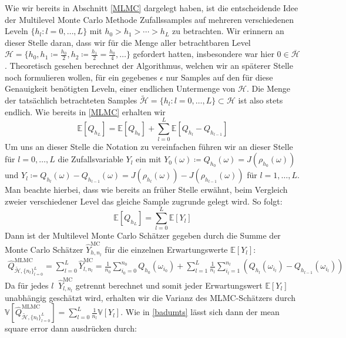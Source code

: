 Wie wir bereits in Abschnitt \ref{MLMC} dargelegt haben, ist die entscheidende Idee der Multilevel Monte Carlo Methode Zufallssamples auf mehreren verschiedenen Leveln $ \{ h_l : l = 0,\dots,L \} $ mit $ h_0 > h_1 > \cdots > h_L $ zu betrachten. Wir erinnern an dieser Stelle daran, dass wir für die Menge aller betrachtbaren Level $ \mathcal{H} = \{ h_0 , h_1 \coloneqq \frac{h_0}{2},h_2 \coloneqq \frac{h_1}{2} = \frac{h_0}{4}, \dots \} $ gefordert hatten, insbesondere war hier $0 \in \overline{\mathcal{H}}$. Theoretisch gesehen berechnet der Algorithmus, welchen wir an späterer Stelle noch formulieren wollen, für ein gegebenes $ \epsilon $ nur Samples auf den für diese Genauigkeit benötigten Leveln, einer endlichen Untermenge von $ \mathcal{H} $. Die Menge der tatsächlich betrachteten Samples $ \tilde{\mathcal{H}} = \{ h_l : l = 0,\dots,L \} \subset \mathcal{H} $ ist also stets endlich.
Wie bereits in \ref{MLMC} erhalten wir 
\[
\mathbb{E}[Q_{h_L}] = \mathbb{E}[Q_{h_0}] + \sum_ {l=0}^L \mathbb{E}[Q_{h_l}-Q_{h_{l-1}}]  
\]
Um uns an dieser Stelle die Notation zu vereinfachen führen wir an dieser Stelle für $ l=0,\dots,L $ die Zufallsvariable $ Y_l $ ein mit $ Y_0(\omega) \coloneqq Q_{h_0}(\omega) = J(\rho_{h_0}(\omega)) $ und $ Y_l \coloneqq Q_{h_l}(\omega) - Q_{h_{l-1}}(\omega) =  J(\rho_{h_l}(\omega)) - J(\rho_{h_{l-1}}(\omega))  $ für $ l=1,\dots,L $. Man beachte hierbei, dass wie bereits an früher Stelle erwähnt, beim Vergleich zweier verschiedener Level das gleiche Sample zugrunde gelegt wird. 
So folgt:
\[
	\mathbb{E}[Q_{h_L}] = \sum_{l=0}^L \mathbb{E}[Y_l]
\]
Dann ist der Multilevel Monte Carlo Schätzer gegeben durch die Summe der Monte Carlo Schätzer $ \widehat{Y}_{h,n_l}^{\text{MC}} $ für die einzelnen Erwartungswerte $ \mathbb{E}[Y_l] $:
\begin{align}
	\widehat{Q}_{\tilde{\mathcal{H}},\{ n_l \}_{l=0}^L }^{\text{MLMC}} = \sum_{l=0}^{L} \widehat{Y}_{l,n_l}^{\text{MC}} =  \frac{1}{n_0} \sum_{i_0=0}^{n_0} Q_{h_0}(\omega_{i_0}) + \sum_{l=1}^{L} \frac{1}{n_l} \sum_{i_l=1}^{n_l} \left( Q_{h_l}(\omega_{i_l}) - Q_{h_{l-1}}(\omega_{i_l})\right)
\end{align}
Da für jedes $ l \ $ $ \widehat{Y}_{l,n_l}^{\text{MC}} $ getrennt berechnet und somit jeder Erwartungswert $ \mathbb{E}[Y_l] $ unabhängig geschätzt wird, erhalten wir die Varianz des MLMC-Schätzers durch $\mathbb{V}[ \widehat{Q}_{\tilde{\mathcal{H}},\{ n_l \}_{l=0}^L }^{\text{MLMC}} ] = \sum_{l=0}^{L} \frac{1}{n_l} \mathbb{V}[Y_l]$. Wie in \ref{badumts} lässt sich dann der mean square error dann ausdrücken durch:
